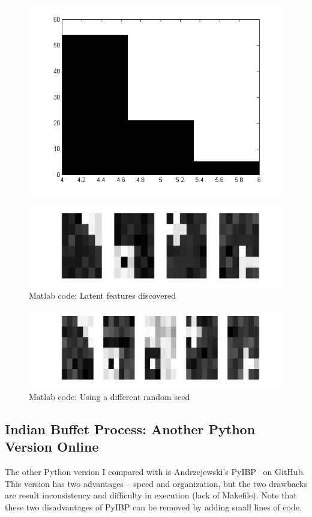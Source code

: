 \begin{figure}[!ht]
\centering
    \includegraphics[width=0.5\linewidth]{IBP_MATLABcode/Fig3_histK.png}
    \label{fig:matlabKplus}
\end{figure}

\begin{figure}[!ht]
\centering
    \includegraphics[width=0.8\linewidth]{IBP_MATLABcode/Fig4_results.png}
    \caption{Matlab code: Latent features discovered}
    \label{fig:matlabresults}
\end{figure}

\begin{figure}[!ht]
\centering
    \includegraphics[width=0.8\linewidth]{IBP_MATLABcode/Fig5_messup.png}
    \caption{Matlab code: Using a different random seed}
    \label{fig:matlab25}
\end{figure}

\subsection{Indian Buffet Process: Another Python Version Online}

The other Python version I compared with is Andrzejewski's PyIBP~\cite{ibpgithub} on GitHub. This version has two advantages -- speed and organization, but the two drawbacks are result inconsistency and difficulty in execution (lack of Makefile). Note that these two disadvantages of PyIBP can be removed by adding small lines of code.\\

